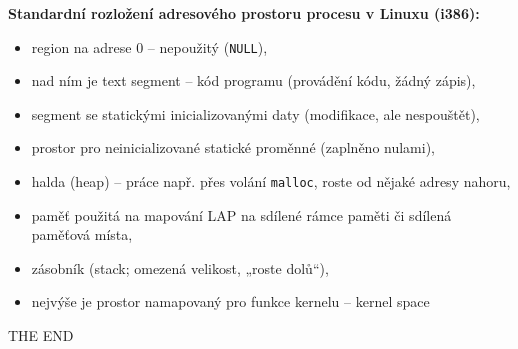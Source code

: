 \documentclass[a4paper, 11pt]{article}
\newcommand{\tcmd}[1]{\texttt{#1}}
\begin{document}
\textbf{Standardní rozložení adresového prostoru procesu v Linuxu (i386):}
\begin{itemize}
    \item region na adrese 0 -- nepoužitý (\tcmd{NULL}),
    \item nad ním je text segment -- kód programu (provádění kódu, žádný zápis),
    \item segment se statickými inicializovanými daty (modifikace, ale nespouštět),
    \item prostor pro neinicializované statické proměnné (zaplněno nulami),
    \item halda (heap) -- práce např. přes volání \tcmd{malloc}, roste od nějaké adresy nahoru,
    \item paměť použitá na mapování LAP na sdílené rámce paměti či sdílená paměťová místa,
    \item zásobník (stack; omezená velikost, „roste dolů“),
    \item nejvýše je prostor namapovaný pro funkce kernelu -- kernel space
\end{itemize}

\clearpage
\thispagestyle{empty}


\begin{center}
\Huge THE END
\end{center}

\end{document}

